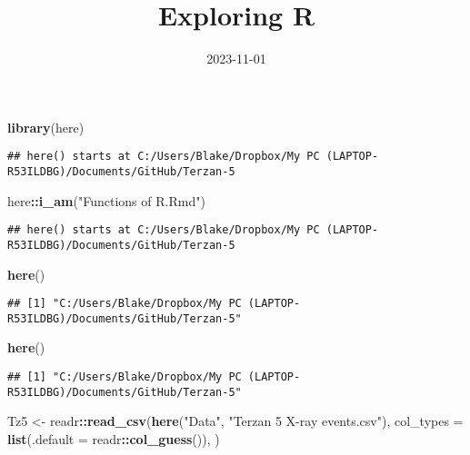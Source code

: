 \documentclass[
]{article}
\title{Exploring R}
\author{}
\date{\vspace{-2.5em}2023-11-01}
\newenvironment{Shaded}{\begin{snugshade}}{\end{snugshade}}
\newcommand{\AttributeTok}[1]{\textcolor[rgb]{0.13,0.29,0.53}{#1}}
\newcommand{\FunctionTok}[1]{\textcolor[rgb]{0.13,0.29,0.53}{\textbf{#1}}}
\newcommand{\NormalTok}[1]{#1}
\newcommand{\OtherTok}[1]{\textcolor[rgb]{0.56,0.35,0.01}{#1}}
\newcommand{\SpecialCharTok}[1]{\textcolor[rgb]{0.81,0.36,0.00}{\textbf{#1}}}
\newcommand{\StringTok}[1]{\textcolor[rgb]{0.31,0.60,0.02}{#1}}
\begin{document}
\maketitle

\begin{Shaded}
\begin{Highlighting}[]
\FunctionTok{library}\NormalTok{(here)}
\end{Highlighting}
\end{Shaded}

\begin{verbatim}
## here() starts at C:/Users/Blake/Dropbox/My PC (LAPTOP-R53ILDBG)/Documents/GitHub/Terzan-5
\end{verbatim}

\begin{Shaded}
\begin{Highlighting}[]
\NormalTok{here}\SpecialCharTok{::}\FunctionTok{i\_am}\NormalTok{(}\StringTok{"Functions of R.Rmd"}\NormalTok{)}
\end{Highlighting}
\end{Shaded}

\begin{verbatim}
## here() starts at C:/Users/Blake/Dropbox/My PC (LAPTOP-R53ILDBG)/Documents/GitHub/Terzan-5
\end{verbatim}

\begin{Shaded}
\begin{Highlighting}[]
\FunctionTok{here}\NormalTok{()}
\end{Highlighting}
\end{Shaded}

\begin{verbatim}
## [1] "C:/Users/Blake/Dropbox/My PC (LAPTOP-R53ILDBG)/Documents/GitHub/Terzan-5"
\end{verbatim}

\begin{Shaded}
\begin{Highlighting}[]
\FunctionTok{here}\NormalTok{()}
\end{Highlighting}
\end{Shaded}

\begin{verbatim}
## [1] "C:/Users/Blake/Dropbox/My PC (LAPTOP-R53ILDBG)/Documents/GitHub/Terzan-5"
\end{verbatim}

\begin{Shaded}
\begin{Highlighting}[]
\NormalTok{Tz5 }\OtherTok{\textless{}{-}}\NormalTok{ readr}\SpecialCharTok{::}\FunctionTok{read\_csv}\NormalTok{(}\FunctionTok{here}\NormalTok{(}\StringTok{"Data"}\NormalTok{, }\StringTok{"Terzan 5 X{-}ray events.csv"}\NormalTok{), }\AttributeTok{col\_types =} \FunctionTok{list}\NormalTok{(}\AttributeTok{.default =}\NormalTok{ readr}\SpecialCharTok{::}\FunctionTok{col\_guess}\NormalTok{()), )}
\end{Highlighting}
\end{Shaded}
\end{document}
